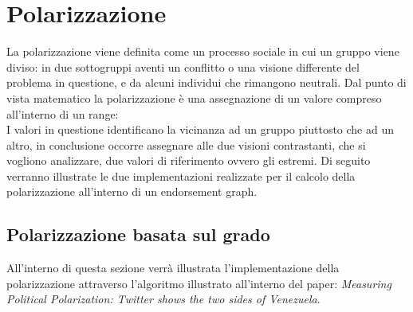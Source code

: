 \section{Polarizzazione}
La polarizzazione viene definita come un processo sociale in cui un gruppo viene diviso: 
in due sottogruppi aventi un conflitto o una visione differente del problema in questione, e da alcuni individui che rimangono neutrali.
Dal punto di vista matematico la polarizzazione è una assegnazione di un valore compreso all'interno di un range:
\begin{equation}
[-1,1]
\end{equation}
I valori in questione identificano la vicinanza ad un gruppo piuttosto che ad un altro, in conclusione occorre assegnare alle due visioni contrastanti, che si vogliono analizzare, due valori di riferimento ovvero gli estremi.
Di seguito verranno illustrate le due implementazioni realizzate per il calcolo della polarizzazione all'interno di un endorsement graph.

\subsection{Polarizzazione basata sul grado}
All'interno di questa sezione verrà illustrata l'implementazione della polarizzazione attraverso l'algoritmo illustrato all'interno del paper: \textit{Measuring Political Polarization: Twitter shows the two sides of Venezuela}.

